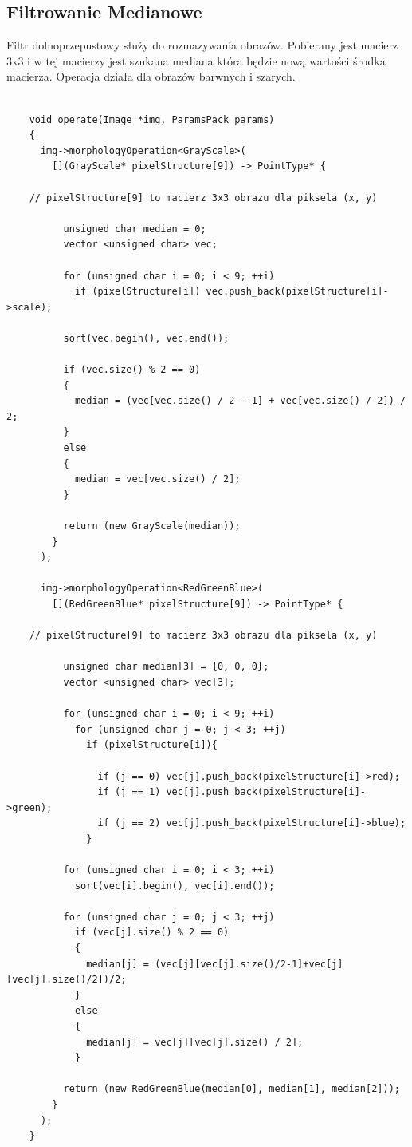 \documentclass{article}
\begin{document}
\FloatBarrier
\subsection{Filtrowanie Medianowe}
Filtr dolnoprzepustowy służy do rozmazywania obrazów. Pobierany jest macierz 3x3 i w tej macierzy jest szukana mediana która będzie nową wartości środka macierza. Operacja działa dla obrazów barwnych i szarych.\\
\begin{Verbatim}[frame=single,label=Filtr Medianowy (Source Code)]
    
    void operate(Image *img, ParamsPack params)
    {
      img->morphologyOperation<GrayScale>(
        [](GrayScale* pixelStructure[9]) -> PointType* {

	// pixelStructure[9] to macierz 3x3 obrazu dla piksela (x, y)

          unsigned char median = 0;
          vector <unsigned char> vec;

          for (unsigned char i = 0; i < 9; ++i)
            if (pixelStructure[i]) vec.push_back(pixelStructure[i]->scale);

          sort(vec.begin(), vec.end());

          if (vec.size() % 2 == 0)
          {
            median = (vec[vec.size() / 2 - 1] + vec[vec.size() / 2]) / 2;
          }
          else
          {
            median = vec[vec.size() / 2];
          }

          return (new GrayScale(median));
        }
      );

      img->morphologyOperation<RedGreenBlue>(
        [](RedGreenBlue* pixelStructure[9]) -> PointType* {

	// pixelStructure[9] to macierz 3x3 obrazu dla piksela (x, y) 

          unsigned char median[3] = {0, 0, 0};
          vector <unsigned char> vec[3];

          for (unsigned char i = 0; i < 9; ++i)
            for (unsigned char j = 0; j < 3; ++j)
              if (pixelStructure[i]){
              
                if (j == 0) vec[j].push_back(pixelStructure[i]->red);
                if (j == 1) vec[j].push_back(pixelStructure[i]->green);
                if (j == 2) vec[j].push_back(pixelStructure[i]->blue);
              }

          for (unsigned char i = 0; i < 3; ++i)
            sort(vec[i].begin(), vec[i].end());

          for (unsigned char j = 0; j < 3; ++j)
            if (vec[j].size() % 2 == 0)
            {
              median[j] = (vec[j][vec[j].size()/2-1]+vec[j][vec[j].size()/2])/2;
            }
            else
            {
              median[j] = vec[j][vec[j].size() / 2];
            }

          return (new RedGreenBlue(median[0], median[1], median[2]));
        }
      );
    }
    
\end{Verbatim}
\end{document}
